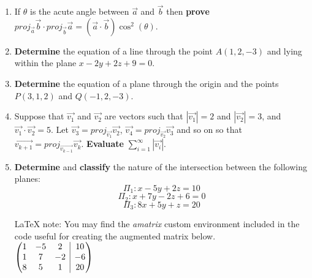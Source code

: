 \documentclass[12pt]{book}
\makeatletter
\newenvironment{amatrix}[1]{%
  \left(\begin{array}{@{}*{#1}{c}|c@{}}
}{%
  \end{array}\right)
}
\makeatother
\begin{document}
\begin{enumerate}
\newpage

\item If $\theta$ is the acute angle between $\vec{a}$ and $\vec{b}$ then \textbf{prove} $proj_{\vec{a}}\vec{b} \cdot proj_{\vec{b}}\vec{a} = (\vec{a} \cdot \vec{b}) \cos^2(\theta)$.

\newpage

\item \textbf{Determine} the equation of a line through the point $A(1,2,-3)$ and lying within the plane $x-2y+2z+9=0$.

\newpage

\item \textbf{Determine} the equation of a plane through the origin and the points $P(3,1,2)$ and $Q(-1,2,-3)$.

\newpage


\item Suppose that $\vec{v_1}$ and $\vec{v_2}$ are vectors such that $|\vec{v_1}|=2$ and $|\vec{v_2}| = 3$, and $\vec{v_1} \cdot \vec{v_2} = 5	$. Let $\vec{v_3} = proj_{\vec{v_1}}\vec{v_2}$, $\vec{v_4} = proj_{\vec{v_2}}\vec{v_3}$ and so on so that $\vec{v_{k+1}} = proj_{\vec{v_{k-1}}}\vec{v_k}$.  \textbf{Evaluate} $\sum\limits_{i=1}^{\infty} |\vec{v_i}|$.

\newpage

\item \textbf{Determine} and \textbf{classify} the nature of the intersection between the following planes:
$$\Pi_1: x-5y+2z=10 $$
$$\Pi_2: x+7y-2z+6=0 $$
$$\Pi_3: 8x+5y+z=20 $$


\LaTeX{} note: You may find the \emph{amatrix} custom environment included in the code useful for creating the augmented matrix below.\\

$
\begin{amatrix}{3}
   1 & -5 & 2 & 10\\  1 & 7 & -2  & -6\\ 8 & 5 & 1 & 20 
 \end{amatrix}
$


\newpage



\end{enumerate}
\end{document}
